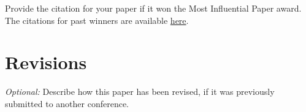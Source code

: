 \documentclass[pageno]{jpaper}
\begin{document}
Provide the citation for your paper if it won the Most Influential
Paper award. The citations for past winners are available
\href{https://www.sigarch.org/benefit/awards/acm-sigarch-sigplan-sigops-asplos-influential-paper-award/}{here}.


\section{Revisions}
\label{sec:revisions}

 \emph{Optional:} Describe how this paper has been revised, if it was previously submitted to another conference.

\pagebreak


\end{document}
